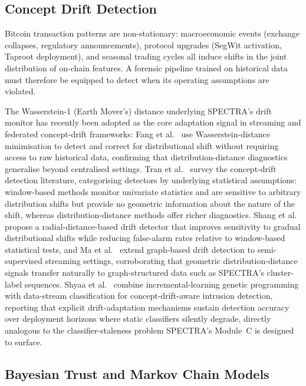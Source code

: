 \documentclass[journal]{IEEEtran}
\newcommand{\spectra}{\textsc{SPECTRA}}
\begin{document}
\subsection{Concept Drift Detection}
\label{subsec:drift_related}

Bitcoin transaction patterns are non-stationary: macroeconomic events
(exchange collapses, regulatory announcements), protocol upgrades (SegWit
activation, Taproot deployment), and seasonal trading cycles all induce shifts
in the joint distribution of on-chain features.  A forensic pipeline trained
on historical data must therefore be equipped to detect when its operating
assumptions are violated.

The Wasserstein-1 (Earth Mover's) distance underlying \spectra{}'s drift
monitor has recently been adopted as the core adaptation signal in streaming
and federated concept-drift frameworks: Fang et al.~\cite{Fang2026} use
Wasserstein-distance minimisation to detect and correct for distributional
shift without requiring access to raw historical data, confirming that
distribution-distance diagnostics generalise beyond centralised settings.
Tran et al.~\cite{Tran2025} survey the concept-drift detection literature,
categorising detectors by underlying statistical assumptions:
window-based methods monitor univariate statistics and are sensitive to
arbitrary distribution shifts but provide no geometric information about the
nature of the shift, whereas distribution-distance methods offer richer
diagnostics.  Shang et al.~\cite{Shang2025} propose a radial-distance-based
drift detector that improves sensitivity to gradual distributional shifts
while reducing false-alarm rates relative to window-based statistical tests,
and Ma et al.~\cite{Ma2026} extend graph-based drift detection to
semi-supervised streaming settings, corroborating that geometric
distribution-distance signals transfer naturally to graph-structured data
such as \spectra{}'s cluster-label sequences.  Shyaa et
al.~\cite{Shyaa2023} combine incremental-learning genetic programming with
data-stream classification for concept-drift-aware intrusion detection,
reporting that explicit drift-adaptation mechanisms sustain detection accuracy
over deployment horizons where static classifiers silently degrade, directly
analogous to the classifier-staleness problem \spectra{}'s Module~C is
designed to surface.

\subsection{Bayesian Trust and Markov Chain Models}
\label{subsec:bayesian_related}
\end{document}
